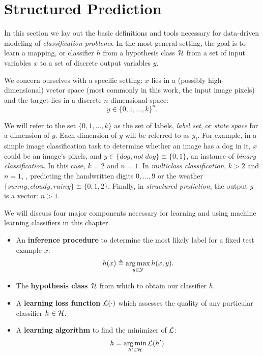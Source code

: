 \chapter{Structured Prediction}

In this section we lay out the basic definitions and tools necessary for 
data-driven modeling of {\em classification problems}.  In the most general 
setting, the goal is to learn a mapping, or classifier $h$ from a hypothesis 
class $\mathcal{H}$ from a set of input variables $x$ to a set of discrete output 
variables $y$.   

We concern ourselves with a specific setting: $x$ lies in a (possibly 
high-dimensional) vector space (most commonly in this work, the input image 
pixels) and the target lies in a discrete $n$-dimensional space: 
$$y \in \{0,1,\ldots,k\}^n.$$  

We will refer to the set $\{0,1,\ldots,k\}$ as the set of labels, {\em label 
set}, or {\em state space} for a dimension of $y$.  Each dimension of $y$ will 
be referred to as $y_i$.  For example, in a simple image classification task to 
determine whether an image has a dog in it, $x$ could be an image's pixels, and 
$y \in \{dog, not~dog\} \cong \{0,1\} $, an instance of {\em binary 
classification}. In this case, $k = 2$ and $n 
= 1$.  In {\em multiclass classification}, $k>2$ and $n = 1$, \eg, predicting 
the handwritten digits $0,\dots,9$ or the weather $\{sunny, cloudy, rainy\} 
\cong \{0,1,2\}$.  Finally, in {\em structured prediction}, the output $y$ is a 
vector: $n > 1$.

We will discuss four major components necessary for learning and using machine 
learning classifiers in this chapter.

\begin{itemize}
\item An {\bf inference procedure} to determine the most likely label for a 
fixed test example $x$: \begin{equation}
h(x) \triangleq \mathop{\arg\max}_{y \in \mathcal{Y}} h(x,y).
\end{equation}
\item The {\bf hypothesis class $\mathcal{H}$} from which to obtain our classifier $h$.
\item  A {\bf learning loss function} $\mathcal{L}(\cdot)$ which assesses the quality 
of any particular classifier $h \in \mathcal{H}$.
\item A {\bf learning algorithm} to find the minimizer of $\mathcal{L}$: 
\begin{equation}
h = \mathop{\arg\min}_{h' \in \mathcal{H}} \mathcal{L}(h').
\end{equation}
\end{itemize}

